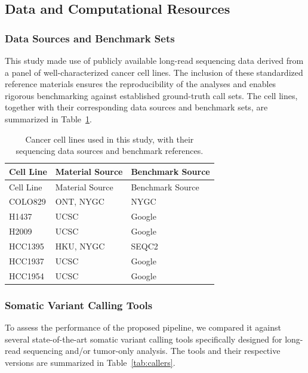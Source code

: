 \documentclass[pdflatex,sn-nature]{sn-jnl}
\begin{document}
\subsection{Data and Computational Resources}\label{data-and-computational-resources}

\subsubsection{Data Sources and Benchmark Sets}\label{data-sources-and-benchmark-sets}

This study made use of publicly available long-read sequencing data derived from a panel of well-characterized cancer cell lines. The inclusion of these standardized reference materials ensures the reproducibility of the analyses and enables rigorous benchmarking against established ground-truth call sets. The cell lines, together with their corresponding data sources and benchmark sets, are summarized in Table~\ref{tab:cell-lines}.

\begin{longtable}[]{@{}lll@{}}
\caption{Cancer cell lines used in this study, with their sequencing data sources and benchmark references.}
\label{tab:cell-lines} \\
\toprule
Cell Line & Material Source & Benchmark Source \\
\midrule
\endfirsthead
\toprule
Cell Line & Material Source & Benchmark Source \\
\midrule
\endhead
\bottomrule
\endlastfoot
COLO829 & ONT, NYGC & NYGC \\
H1437 & UCSC & Google \\
H2009 & UCSC & Google \\
HCC1395 & HKU, NYGC & SEQC2 \\
HCC1937 & UCSC & Google \\
HCC1954 & UCSC & Google \\
\end{longtable}

\subsubsection{Somatic Variant Calling Tools}\label{somatic-variant-calling-tools}

To assess the performance of the proposed pipeline, we compared it against several state-of-the-art somatic variant calling tools specifically designed for long-read sequencing and/or tumor-only analysis. The tools and their respective versions are summarized in Table~\ref{tab:callers}.
\end{document}
